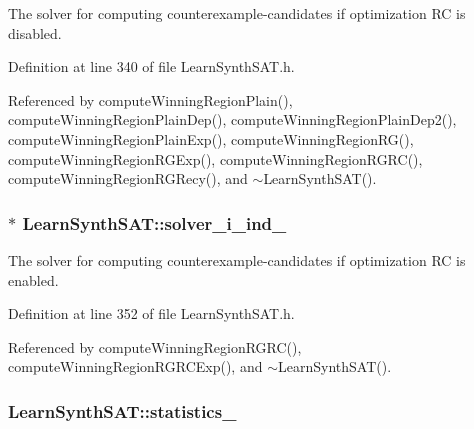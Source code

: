 The solver for computing counterexample-\/candidates if optimization R\-C is disabled. 



Definition at line 340 of file Learn\-Synth\-S\-A\-T.\-h.



Referenced by compute\-Winning\-Region\-Plain(), compute\-Winning\-Region\-Plain\-Dep(), compute\-Winning\-Region\-Plain\-Dep2(), compute\-Winning\-Region\-Plain\-Exp(), compute\-Winning\-Region\-R\-G(), compute\-Winning\-Region\-R\-G\-Exp(), compute\-Winning\-Region\-R\-G\-R\-C(), compute\-Winning\-Region\-R\-G\-Recy(), and $\sim$\-Learn\-Synth\-S\-A\-T().

\hypertarget{classLearnSynthSAT_ae7f4a4e3546f46ad1256e203311226cf}{
\subsubsection[{solver\-\_\-i\-\_\-ind\-\_\-}]{$\ast$ Learn\-Synth\-S\-A\-T\-::solver\-\_\-i\-\_\-ind\-\_\-\hspace{0.3cm}{\ttfamily [protected]}}}\label{classLearnSynthSAT_ae7f4a4e3546f46ad1256e203311226cf}


The solver for computing counterexample-\/candidates if optimization R\-C is enabled. 



Definition at line 352 of file Learn\-Synth\-S\-A\-T.\-h.



Referenced by compute\-Winning\-Region\-R\-G\-R\-C(), compute\-Winning\-Region\-R\-G\-R\-C\-Exp(), and $\sim$\-Learn\-Synth\-S\-A\-T().

\hypertarget{classLearnSynthSAT_a2175c687276e00fa0fe3e158680affc1}{
\subsubsection[{statistics\-\_\-}]{ Learn\-Synth\-S\-A\-T\-::statistics\-\_\-\hspace{0.3cm}{\ttfamily [protected]}}}\label{classLearnSynthSAT_a2175c687276e00fa0fe3e158680affc1}


